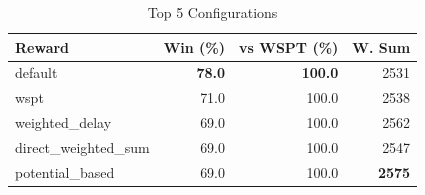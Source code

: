\begin{table}[htbp]%
\centering%
\begin{tabular}{lrrr}%
\toprule%
\textbf{Reward}&\textbf{Win (\%)}&\textbf{vs WSPT (\%)}&\textbf{W. Sum}\\%
\midrule%
default&\textbf{78.0}&\textbf{100.0}&2531\\%
wspt&71.0&100.0&2538\\%
weighted_delay&69.0&100.0&2562\\%
direct_weighted_sum&69.0&100.0&2547\\%
potential_based&69.0&100.0&\textbf{2575}\\%
\bottomrule%
\end{tabular}%
\caption{Top 5 Configurations}%
\label{tab:summary}%
\end{table}